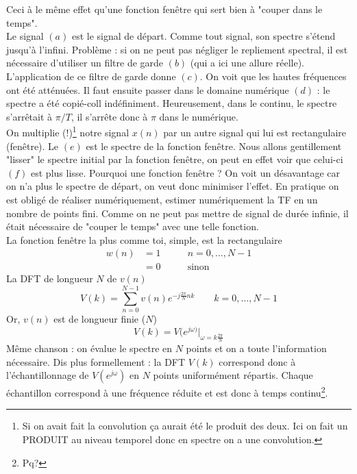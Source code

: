 	Ceci à le même effet qu'une fonction fenêtre qui sert bien à "couper dans le temps".\\
		
	Le signal $(a)$ est le signal de départ. Comme tout signal, son spectre s'étend jusqu'à l'infini. 
	Problème : si on ne peut pas négliger le repliement spectral, il est nécessaire d'utiliser un 
	filtre de garde $(b)$ (qui a ici une allure réelle). L'application de ce filtre de garde donne 
	$(c)$. On voit que les hautes fréquences ont été atténuées. Il faut ensuite passer dans le domaine 
	numérique $(d)$ : le spectre a été copié-coll indéfiniment. Heureusement, dans le continu, le 
	spectre s'arrêtait à $\pi/T$, il s'arrête donc à $\pi$ dans le numérique.\\

\newpage
	 On multiplie (!)\footnote{
	Si on avait fait la convolution ça aurait été le produit des deux. Ici on fait un PRODUIT au niveau 
	temporel donc en spectre on a une convolution.} notre signal $x(n)$ par un autre signal qui lui est
	rectangulaire (fenêtre). Le $(e)$ est le spectre de la fonction fenêtre. Nous allons gentillement 
	"lisser" le spectre initial par la fonction fenêtre, on peut en effet voir que celui-ci $(f)$ est 
	plus lisse. Pourquoi une fonction fenêtre ? On voit un désavantage car on n'a plus le spectre de départ, 
	on veut donc minimiser l'effet. En pratique on est obligé de réaliser numériquement, estimer 
	numériquement la TF en un nombre de points fini. Comme on ne peut pas mettre de signal de durée infinie, 
	il était nécessaire de "couper le temps" avec une telle fonction.\\
	
	La fonction fenêtre la plus comme toi, simple, est la rectangulaire
	\begin{equation}
	\begin{array}{lll}
	w(n) &= 1&\qquad n=0,\dots,N-1\\
	&=0&\qquad\text{sinon}
	\end{array}
	\end{equation}
	La DFT de longueur $N$ de $v(n)$
	\begin{equation}
	V(k) = \sum_{n=0}^{N-1} v(n)e^{-j\frac{2\pi}{N}nk}\qquad k=0,\dots,N-1
	\end{equation}
	Or, $v(n)$ est de longueur finie ($N$)
	\begin{equation}
	V(k) = V(e^{j\omega)}|_{\omega=k\frac{2\pi}{N}}
	\end{equation}
	Même chanson : on évalue le spectre en $N$ points et on a toute l'information nécessaire. Dis 
	plus formellement : la DFT $V(k)$ correspond donc à l’échantillonnage de $V(e^{j\omega})$ en $N$ points
	uniformément répartis. Chaque échantillon correspond à une fréquence réduite et est donc à temps 
	continu\footnote{Pq?}.\\
	
